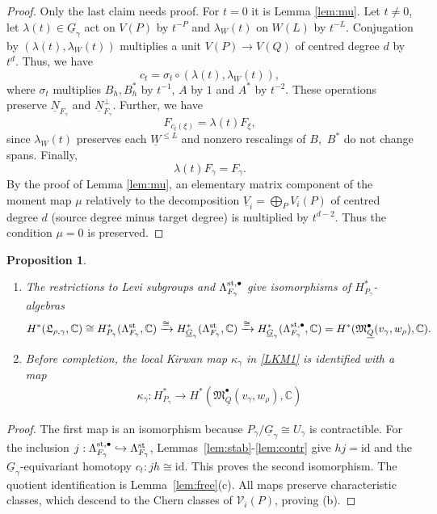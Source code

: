 \documentclass[11pt,reqno]{amsart}
\newtheorem{Proposition}[Theorem]{Proposition}
\theoremstyle{definition}
\theoremstyle{remark}
\def\bbC{\mathbb C}
\def\dN{\underline N}
\def\dG{\underline G}
\def\dV{\underline V}
\def\dW{\underline W}
\def\dQ{\underline Q}
\def\calV{\mathcal V}
\def\M{\mathfrak M}
\begin{document}
\begin{proof}
Only the last claim needs proof.
For $t=0$ it is Lemma \ref{lem:mu}. Let $t\neq0$, let $\lambda(t)\in\dG_\gamma$ act on $V(P)$ by $t^{-P}$ and
$\lambda_W(t)$ on $W(L)$ by $t^{-L}$. 
Conjugation by $(\lambda(t),\lambda_W(t))$ multiplies a unit $V(P)\to V(Q)$ of centred degree $d$ by $t^d$. 
Thus, we have
$$c_t=\sigma_t\circ(\lambda(t),\lambda_W(t)),$$ 
where $\sigma_t$ multiplies $B_h,B_h^*$ by $t^{-1}$, $A$ by $1$ and $A^*$ by $t^{-2}$. These operations
preserve $\dN_{F_\gamma}$ and $\dN_{F_\gamma}^\perp$.
Further, we have  
$$F_{c_t(\xi)}=\lambda(t)F_\xi,$$ 
since $\lambda_W(t)$ preserves each $\dW^{\leqslant L}$ and nonzero rescalings
of $B,$ $B^*$ do not change spans. Finally, 
$$\lambda(t)F_\gamma=F_\gamma.$$
By the proof of Lemma \ref{lem:mu}, an elementary matrix component of the moment map $\mu$ relatively to the decomposition
$\dV_i=\bigoplus_PV_i(P)$ of centred degree $d$ (source degree minus target degree) is multiplied by
$t^{d-2}$. Thus the condition $\mu=0$ is preserved.
\end{proof}

\begin{Proposition}\label{prop:coh}\hfill
\begin{enumerate}[label=$\mathrm{(\alph*)}$,leftmargin=8mm,itemsep=1mm]
\item 
The restrictions to Levi subgroups and $\Lambda_{F_\gamma}^{\rm st,\bullet}$ give isomorphisms of $H^*_{P_\gamma}$-algebras
\[
H^*(\mathfrak L_{\rho,\gamma},\bbC)\cong
H^*_{P_\gamma}(\Lambda^{\rm st}_{F_\gamma},\bbC)\xrightarrow{\cong}
H^*_{\dG_\gamma}(\Lambda^{\rm st}_{F_\gamma},\bbC)\xrightarrow{\cong}
H^*_{\dG_\gamma}(\Lambda_{F_\gamma}^{\rm st,\bullet},\bbC)=H^*(\M_{\dQ}^\bullet(v_\gamma,w_\rho),\bbC).
\]
\item
Before completion, the local Kirwan map $\kappa_\gamma$ in \eqref{LKM1} is identified with a map
\begin{align}\label{LKM2}
\kappa_\gamma:H^*_{P_\gamma}\to H^*(\M_{\dQ}^\bullet(v_\gamma,w_\rho),\bbC)\end{align}
\end{enumerate}
\end{Proposition}

\begin{proof}
The first map is an isomorphism because
$P_\gamma/\dG_\gamma\cong U_\gamma$ is contractible.
For the inclusion $j:\Lambda_{F_\gamma}^{\rm st,\bullet}\hookrightarrow
\Lambda_{F_\gamma}^{\rm st}$, Lemmas~\ref{lem:stab}-\ref{lem:contr}
give $hj=\mathrm{id}$ and the $\dG_\gamma$-equivariant homotopy
$c_t:j h\cong\mathrm{id}$. This proves the second isomorphism.
The quotient identification is Lemma~\ref{lem:free}(c).
All maps preserve characteristic classes, which descend to the
Chern classes of $\calV_i(P)$, proving (b).
\end{proof}
\end{document}

